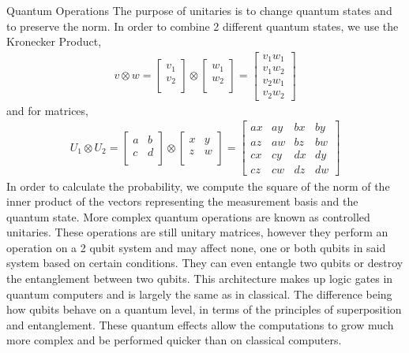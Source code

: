 \documentclass[final, 20pt]{beamer}
\newlength{\onecolwid}
\newlength{\twocolwid}
\begin{document}
\begin{frame}[t]
\begin{columns}[t]
\begin{column}{\twocolwid}
\begin{columns}[t,totalwidth=\twocolwid]
\begin{column}{\onecolwid}
\begin{block}{Quantum Operations}
The purpose of unitaries is to change quantum states and to preserve the norm. In order to combine 2 different quantum states, we use the Kronecker Product,
\begin{align}
	v \otimes w 
	= \begin{bmatrix} v_1 \\ v_2 \\ \end{bmatrix}
	\otimes
	\begin{bmatrix} w_1 \\ w_2 \\ \end{bmatrix}
	=
	\begin{bmatrix} v_1 w_1 \\ v_1 w_2 \\ 
	v_2 w_1 \\ v_2 w_2 \end{bmatrix}
\end{align}
and for matrices,
\begin{align}
	U_1 \otimes U_2 
	= \begin{bmatrix} a & b  \\ c & d \\ \end{bmatrix}
	\otimes
	\begin{bmatrix} x & y \\ z & w \\ \end{bmatrix}
	=
	\begin{bmatrix} 
	ax & ay & bx & by \\ 
	az & aw & bz & bw \\ 
	cx & cy & dx & dy \\ 
	cz & cw & dz & dw 
	\end{bmatrix}
\end{align}
In order to calculate the probability, we compute 
the square of the norm of the inner product of the vectors representing the measurement basis and the quantum state.  More complex quantum operations are known as controlled unitaries. These operations are still unitary matrices, however they perform an operation on a 2 qubit system and may affect none, one or both qubits in said system based on certain conditions. They can even entangle two qubits or destroy the entanglement between two qubits. This architecture makes up logic gates in quantum computers and is largely the same as in classical. The difference being how qubits behave on a quantum level, in terms of the principles of superposition and entanglement. These quantum effects allow the computations to grow much more complex and be performed quicker than on classical computers.
\end{block}


\end{column}
\end{columns}
\end{column}
\end{columns}
\end{frame}
\end{document}
